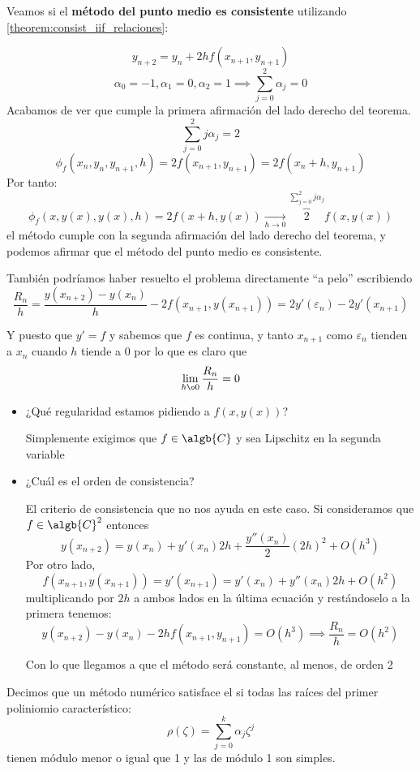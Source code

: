 \begin{example}
	Veamos si el \textbf{método del punto medio es consistente} utilizando \ref{theorem:consist_iif_relaciones}:

	\[y_{n+2} = y_n + 2h f(x_{n+1},y_{n+1})\]
	\[α_0=-1, α_1=0, α_2=1 \implies \sum_{j=0}^2 α_j = 0\]
	Acabamos de ver que cumple la primera afirmación del lado derecho del teorema.
	\[\sum_{j=0}^2 jα_j = 2\]
	\[\phi_f(x_n,y_n,y_{n+1},h) = 2f(x_{n+1},y_{n+1}) = 2f(x_n+h, y_{n+1})\]
	Por tanto:
	\[\phi_f\left( x, y(x), y(x), h \right) = 2f(x+h,y(x)) \underset{h\to0}{\longrightarrow} \overbrace{2}^{\sum_{j=0}^2 jα_j}f(x,y(x))\]
	el método cumple con la segunda afirmación del lado derecho del teorema, y podemos afirmar que el método del punto medio es consistente.

	También podríamos haber resuelto el problema directamente ``a pelo'' escribiendo
	\[\frac{R_n}{h} = \frac{y(x_{n+2})-y(x_n)}{h}-2f(x_{n+1},y(x_{n+1})) = 2y'(ε_n)-2y'(x_{n+1})\]

	Y puesto que $y'=f$ y sabemos que $f$ es continua, y tanto $x_{n+1}$ como $ε_n$ tienden a $x_n$ cuando $h$ tiende a 0 por lo que es claro que
	\[\lim_{h \o 0} \frac{R_n}{h} = 0\]
\end{example}

\begin{obs}
\begin{itemize}
\item ¿Qué regularidad estamos pidiendo a $f(x,y(x))$?

Simplemente exigimos que $f\in \algb{C}$ y sea Lipschitz en la segunda variable

\item ¿Cuál es el orden de consistencia?

El criterio de consistencia que no nos ayuda en este caso. Si consideramos que $f\in \algb{C}^2$ entonces
\[y(x_{n+2})=y(x_n)+y'(x_n)2h + \frac{y''(x_n)}{2}(2h)^2 + O(h^3)\]
Por otro lado,
\[f(x_{n+1},y(x_{n+1}))=y'(x_{n+1}) = y'(x_n) + y''(x_n)2h + O(h^2)\]
multiplicando por $2h$ a ambos lados en la última ecuación y restándoselo a la primera tenemos:
\[y(x_{n+2})-y(x_n)-2hf(x_{n+1},y_{n+1})=O(h^3) \implies \frac{R_n}{h}=O(h^2)\]

Con lo que llegamos a que el método será constante, al menos, de orden 2
\end{itemize}
\end{obs}


Decimos que un método numérico satisface el  si todas las raíces del primer poliniomio característico:
\[ρ(ζ) = \sum_{j=0}^kα_jζ^j\]
tienen módulo menor o igual que 1 y las de módulo 1 son simples.


